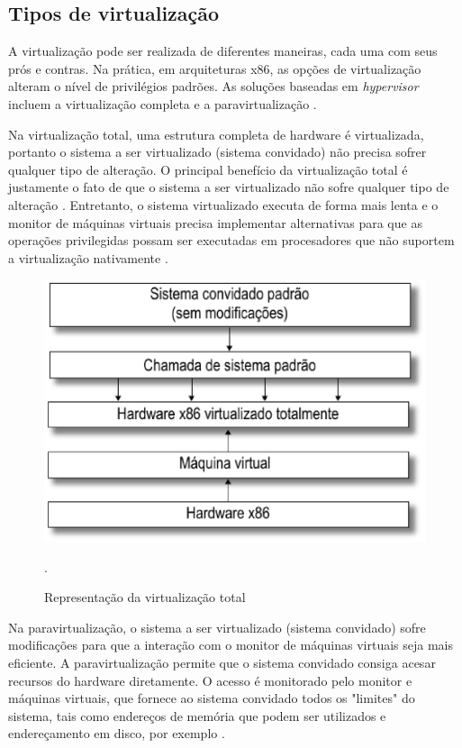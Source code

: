 \subsection{Tipos de virtualização}
A virtualização pode ser realizada de diferentes maneiras, cada uma com seus prós e contras. Na prática, em arquiteturas x86, as opções de virtualização alteram o nível de privilégios padrões. As soluções baseadas em \textit{hypervisor} incluem a virtualização completa e a paravirtualização \cite{manoel}.

Na virtualização total, uma estrutura completa de hardware é virtualizada, portanto o sistema a ser virtualizado (sistema convidado) não precisa sofrer qualquer tipo de alteração. O principal benefício da virtualização total é justamente o fato de que o sistema a ser virtualizado não sofre qualquer tipo de alteração \cite{marcos}. Entretanto, o sistema virtualizado executa de forma mais lenta e o monitor de máquinas virtuais precisa implementar alternativas para que as operações privilegidas possam ser executadas em procesadores que não suportem a virtualização nativamente \cite{marcos}.

\begin{figure}[!htb]
\centering
\includegraphics [keepaspectratio=true,scale=0.30]{figuras/full_virtualization.eps}
\caption{Representação da virtualização total}
\cite{marcos}.
\label{full_virtualization}
\end{figure}

Na paravirtualização, o sistema a ser virtualizado (sistema convidado) sofre modificações para que a interação com o monitor de máquinas virtuais seja mais eficiente. A paravirtualização permite que o sistema convidado consiga acesar recursos do hardware diretamente. O acesso é monitorado pelo monitor e máquinas virtuais, que fornece ao sistema convidado todos os "limites" do sistema, tais como endereços de memória que podem ser utilizados e endereçamento em disco, por exemplo \cite{marcos}.

